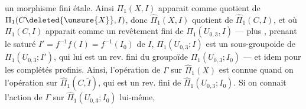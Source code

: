 un morphisme fini étale. Ainsi $\Pi_1(X,I)$ apparait comme quotient de $\Pi_1(C\deleted{\unsure{X}},I)$, donc $\widehat\Pi_1(X,I)$ quotient de $\widehat\Pi_1(C,I)$, et où $\Pi_1(C,I)$ apparait comme un revêtement fini de $\Pi_1(U_{0,3},I)$ --- plus  , prenant le saturé $I'=f^{-1}f(I)=f^{-1}(I_0)$ de $I$, $\Pi_1(U_{0,3};I)$ est un sous-groupoide  de $\Pi_1(U_{0,3};I')$, qui lui est un rev. fini du groupoïde $\Pi_1(U_{0,3};I_0)$ --- et idem pour les complétés profinis. Ainsi, l'opération de $\Gamma$ sur $\widehat\Pi_1(X)$ est connue quand on \unsure{:} l'opération sur $\widehat\Pi_1(C,\widetilde I)$, qui est un rev. fini de $\widehat\Pi_1(U_{0,3};I_0)$. Si on connait l'action de $\Gamma$ sur $\widehat\Pi_1(U_{0,3};I_0)$ lui-même,  

